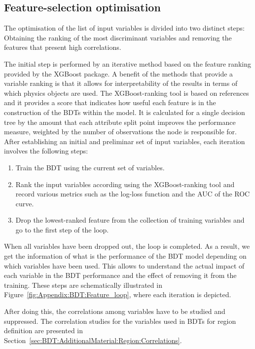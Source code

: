 \subsection{Feature-selection optimisation}
\label{chap:Appendix:BDT:featureOpt}
The optimisation of the list of input variables is divided into two distinct steps: Obtaining the
ranking of the most discriminant variables and removing the features that present high correlations.

The initial step is performed by an iterative method based on the feature ranking provided by the XGBoost package. 
A benefit of the methods that provide a variable ranking is that it allows for interpretability of the results in terms of which physics objects are used.
The XGBoost-ranking tool is based on references~\cite{burges2006learning, wu2010adapting} and it provides a score that 
indicates how useful each feature is in the construction of the BDTs within the model.
It is calculated for a single decision tree by the amount that each attribute split point improves the 
performance measure, weighted by the number of observations the node is responsible for.
After establishing an initial and preliminar set of input variables, each iteration involves the following steps:
\begin{enumerate}
	\item Train the BDT using the current set of variables. 
	\item Rank the input variables according using the XGBoost-ranking tool and
		record various metrics such as the log-loss function and the AUC of the ROC curve.
	\item Drop the lowest-ranked feature from the collection of training variables and go to the first step of the loop.
\end{enumerate}
When all variables have been dropped out, the loop is completed. As a result, we get the information of 
what is the performance of the BDT model depending on which variables have been used.
This allows to understand the actual impact of each variable in the BDT performance
and the effect of removing it from the training.
These steps are schematically illustrated in Figure~\ref{fig:Appendix:BDT:Feature_loop}, where each iteration is depicted.

After doing this, the correlations among variables have to be studied and suppressed. 
The correlation studies for the variables used in BDTs for region definition are presented
in Section~\ref{sec:BDT:AdditionalMaterial:Region:Correlations}.

